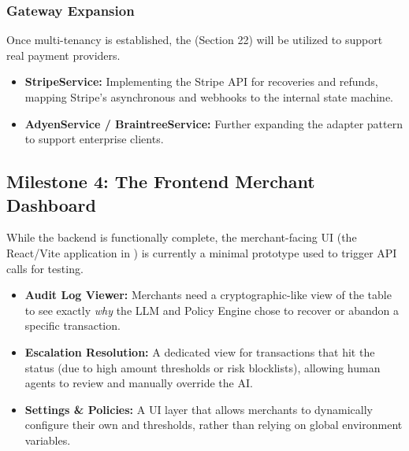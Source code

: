 \subsubsection{Gateway Expansion}
Once multi-tenancy is established, the  (Section 22) will be utilized to support real payment providers.
\begin{itemize}
    \item \textbf{StripeService:} Implementing the Stripe API for recoveries and refunds, mapping Stripe's asynchronous  and  webhooks to the internal state machine.
    \item \textbf{AdyenService / BraintreeService:} Further expanding the adapter pattern to support enterprise clients.
\end{itemize}

\vspace{0.8cm}

\subsection{Milestone 4: The Frontend Merchant Dashboard}

While the backend is functionally complete, the merchant-facing UI (the React/Vite application in ) is currently a minimal prototype used to trigger API calls for testing.

\begin{tcolorbox}[featurebox={UI Requirements}]
\begin{itemize}
    \item \textbf{Audit Log Viewer:} Merchants need a cryptographic-like view of the  table to see exactly \textit{why} the LLM and Policy Engine chose to recover or abandon a specific transaction.
    \item \textbf{Escalation Resolution:} A dedicated view for transactions that hit the  status (due to high amount thresholds or risk blocklists), allowing human agents to review and manually override the AI.
    \item \textbf{Settings \& Policies:} A UI layer that allows merchants to dynamically configure their own  and  thresholds, rather than relying on global environment variables.
\end{itemize}
\end{tcolorbox}


